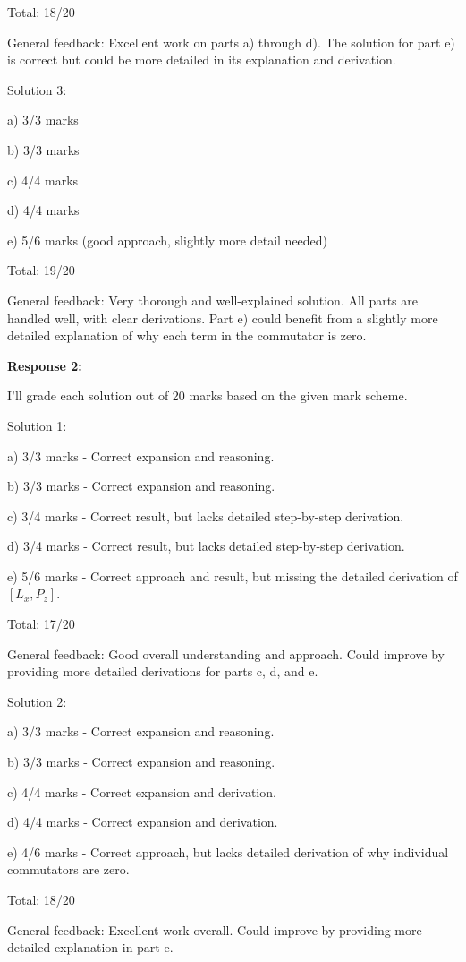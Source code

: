\documentclass[a4paper,11pt]{article}
\begin{document}
Total: 18/20

General feedback: Excellent work on parts a) through d). The solution for part e) is correct but could be more detailed in its explanation and derivation.

Solution 3:

a) 3/3 marks

b) 3/3 marks

c) 4/4 marks

d) 4/4 marks

e) 5/6 marks (good approach, slightly more detail needed)

Total: 19/20

General feedback: Very thorough and well-explained solution. All parts are handled well, with clear derivations. Part e) could benefit from a slightly more detailed explanation of why each term in the commutator is zero.

\bigskip   
\textbf{Response 2:}

I'll grade each solution out of 20 marks based on the given mark scheme.

Solution 1:

a) 3/3 marks - Correct expansion and reasoning.

b) 3/3 marks - Correct expansion and reasoning.

c) 3/4 marks - Correct result, but lacks detailed step-by-step derivation.

d) 3/4 marks - Correct result, but lacks detailed step-by-step derivation.

e) 5/6 marks - Correct approach and result, but missing the detailed derivation of \([L_x, P_z]\).

Total: 17/20

General feedback: Good overall understanding and approach. Could improve by providing more detailed derivations for parts c, d, and e.

Solution 2:

a) 3/3 marks - Correct expansion and reasoning.

b) 3/3 marks - Correct expansion and reasoning.

c) 4/4 marks - Correct expansion and derivation.

d) 4/4 marks - Correct expansion and derivation.

e) 4/6 marks - Correct approach, but lacks detailed derivation of why individual commutators are zero.

Total: 18/20

General feedback: Excellent work overall. Could improve by providing more detailed explanation in part e.
\end{document}

